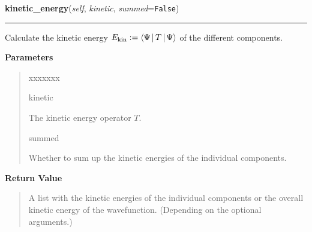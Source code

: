     \vspace{0.5ex}

\hspace{.8\funcindent}\begin{boxedminipage}{\funcwidth}

    \raggedright \textbf{kinetic\_energy}(\textit{self}, \textit{kinetic}, \textit{summed}={\tt False})

    \vspace{-1.5ex}

    \rule{\textwidth}{0.5\fboxrule}
\setlength{\parskip}{2ex}
    Calculate the kinetic energy $E_{\text{kin}} :=
    \Braket{\Psi|T|\Psi}$
    of the different components.

\setlength{\parskip}{1ex}
      \textbf{Parameters}
      \vspace{-1ex}

      \begin{quote}
        \begin{Ventry}{xxxxxxx}

          \item[kinetic]

          The kinetic energy operator $T$.

          \item[summed]

          Whether to sum up the kinetic energies of the individual
          components.

        \end{Ventry}

      \end{quote}

      \textbf{Return Value}
    \vspace{-1ex}

      \begin{quote}
      A list with the kinetic energies of the individual components or the
      overall kinetic energy of the wavefunction. (Depending on the
      optional arguments.)

      \end{quote}

    \end{boxedminipage}

    \label{WaveFunction:WaveFunction:potential_energy}

    \vspace{0.5ex}

